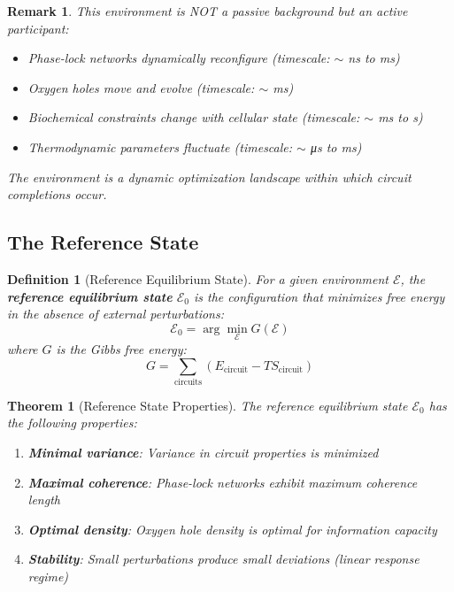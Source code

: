 \documentclass[12pt,a4paper]{article}
\newtheorem{theorem}{Theorem}
\newtheorem{definition}{Definition}
\newtheorem{remark}{Remark}
\begin{document}
\begin{remark}
This environment is NOT a passive background but an active participant:
\begin{itemize}
\item Phase-lock networks dynamically reconfigure (timescale: $\sim$ ns to ms)
\item Oxygen holes move and evolve (timescale: $\sim$ ms)
\item Biochemical constraints change with cellular state (timescale: $\sim$ ms to s)
\item Thermodynamic parameters fluctuate (timescale: $\sim$ μs to ms)
\end{itemize}

The environment is a \textit{dynamic optimization landscape} within which circuit completions occur.
\end{remark}

\subsection{The Reference State}

\begin{definition}[Reference Equilibrium State]
\label{def:reference_state}
For a given environment $\mathcal{E}$, the \textbf{reference equilibrium state} $\mathcal{E}_0$ is the configuration that minimizes free energy in the absence of external perturbations:
\begin{equation}
\mathcal{E}_0 = \arg\min_{\mathcal{E}} G(\mathcal{E})
\end{equation}
where $G$ is the Gibbs free energy:
\begin{equation}
G = \sum_{\text{circuits}} (E_{\text{circuit}} - T S_{\text{circuit}})
\end{equation}
\end{definition}

\begin{theorem}[Reference State Properties]
\label{thm:reference_properties}
The reference equilibrium state $\mathcal{E}_0$ has the following properties:
\begin{enumerate}
\item \textbf{Minimal variance}: Variance in circuit properties is minimized
\item \textbf{Maximal coherence}: Phase-lock networks exhibit maximum coherence length
\item \textbf{Optimal density}: Oxygen hole density is optimal for information capacity
\item \textbf{Stability}: Small perturbations produce small deviations (linear response regime)
\end{enumerate}
\end{theorem}
\end{document}
